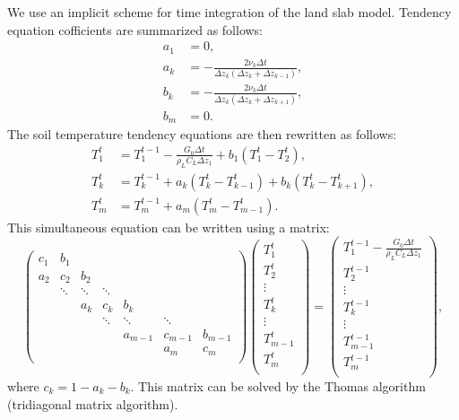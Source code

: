 We use an implicit scheme for time integration of the land slab model.
Tendency equation cofficients are summarized as follows:
\begin{align}
  a_{1} &= 0, \\
  a_{k} &= - \frac{2\nu_{k}\Delta t}{\Delta z_{k}(\Delta z_{k}+\Delta z_{k-1})}, \\
  b_{k} &= - \frac{2\nu_{k}\Delta t}{\Delta z_{k}(\Delta z_{k}+\Delta z_{k+1})}, \\
  b_{m} &= 0.
\end{align}
The soil temperature tendency equations are then rewritten as follows:
\begin{align}
  T_{1}^{t} &= T_{1}^{t-1} - \frac{G_{0}\Delta t}{\rho_{L}C_{L}\Delta z_{1}} + b_{1} (T_{1}^{t}-T_{2}^{t}), \\
  T_{k}^{t} &= T_{k}^{t-1} + a_{k} (T_{k}^{t}-T_{k-1}^{t}) + b_{k} (T_{k}^{t}-T_{k+1}^{t}), \\
  T_{m}^{t} &= T_{m}^{t-1} + a_{m} (T_{m}^{t}-T_{m-1}^{t}).
\end{align}
This simultaneous equation can be written using a matrix: 
\begin{equation}
\begin{pmatrix}
  c_{1}  & b_{1}  &        &        &         &         &         \\
  a_{2}  & c_{2}  & b_{2}  &        &         &         &         \\
         & \ddots & \ddots & \ddots &         &         &         \\
         &        & a_{k}  & c_{k}  & b_{k}   &         &         \\
         &        &        & \ddots & \ddots  & \ddots  &         \\
         &        &        &        & a_{m-1} & c_{m-1} & b_{m-1} \\
         &        &        &        &         & a_{m}   & c_{m}   \\
\end{pmatrix}
\begin{pmatrix}
  T_{1}^{t}   \\
  T_{2}^{t}   \\
  \vdots      \\
  T_{k}^{t}   \\
  \vdots      \\
  T_{m-1}^{t} \\
  T_{m}^{t}   \\
\end{pmatrix}
=
\begin{pmatrix}
  T_{1}^{t-1} - \frac{G_{0}\Delta t}{\rho_{L}C_{L}\Delta z_{1}} \\
  T_{2}^{t-1}   \\
  \vdots        \\
  T_{k}^{t-1}   \\
  \vdots        \\
  T_{m-1}^{t-1} \\
  T_{m}^{t-1}   \\
\end{pmatrix}
,
\end{equation}
where $c_{k} = 1 - a_{k} - b_{k}$.
This matrix can be solved by the Thomas algorithm (tridiagonal matrix algorithm).

